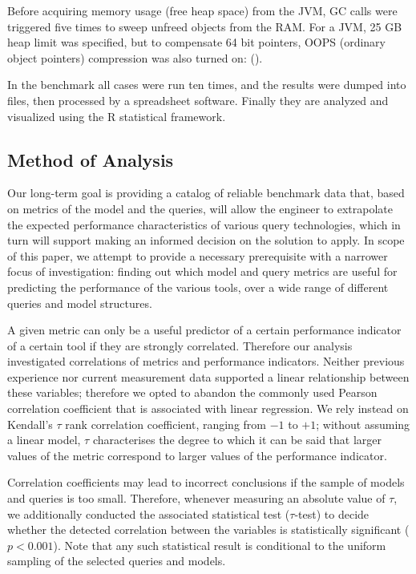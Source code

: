 Before acquiring memory usage (free heap space) from the JVM, GC calls were
triggered five times to sweep unfreed objects from the RAM. For a JVM, 25 GB
heap limit was specified, but to compensate 64 bit pointers, OOPS (ordinary
object pointers) compression was also turned on: ().

In  the benchmark all cases were run ten times, and the results were dumped into
files, then processed by a spreadsheet software. Finally they are analyzed and
visualized using the R statistical framework.

\subsection{Method of Analysis}
Our long-term goal is providing a catalog of reliable benchmark data that,
based on metrics of the model and the queries, will allow the engineer to
extrapolate the expected performance characteristics of various query
technologies, which in turn will support making an informed decision on the
solution to apply. In scope of this paper, we attempt to provide a necessary
prerequisite with a narrower focus of investigation: finding out which model and
query metrics are useful for predicting the performance 
of the various tools, over a wide range of different queries and model
structures.

A given metric can only be a useful predictor of a certain performance indicator
of a certain tool if they are strongly correlated. Therefore our analysis
investigated correlations of metrics and performance indicators. Neither
previous experience nor current measurement data supported a linear relationship
between these variables; therefore we opted to abandon the commonly used Pearson
correlation coefficient that is associated with linear regression. We rely
instead on Kendall's $\tau$ %
 rank correlation coefficient, ranging from $-1$ to $+1$; without assuming a
 linear model, $\tau$ characterises the degree to which it can be said that
 larger values of the metric correspond to larger values of the performance
 indicator.

Correlation coefficients may lead to incorrect conclusions if the sample of
models and queries is too small. Therefore, whenever measuring an absolute value
of $\tau$, we additionally conducted the associated statistical test
($\tau$-test) to decide whether the detected correlation between the variables
is statistically significant ($p < 0.001$). Note that any such statistical result
is conditional to the uniform sampling of the selected queries and models.


